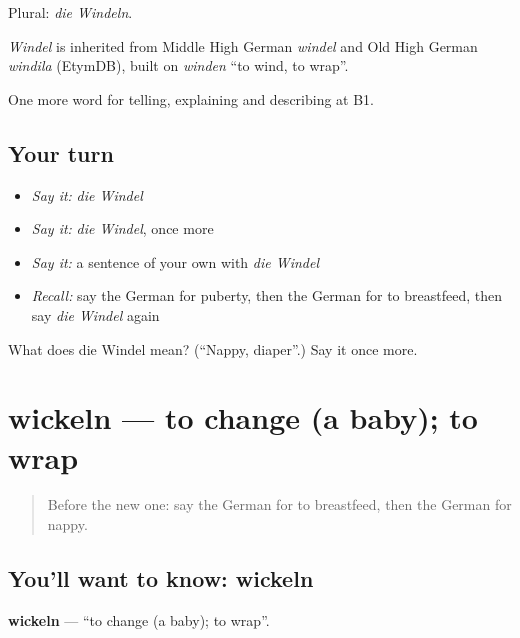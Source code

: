 Plural: \emph{die Windeln}.

\begin{cousinweb}
\emph{Windel} is inherited from Middle High German \emph{windel} and Old High German \emph{windila} (EtymDB), built on \emph{winden} \textquotedblleft{}to wind, to wrap\textquotedblright{}.
\end{cousinweb}

\begin{grammarlens}[title={What you've built}]
One more word for telling, explaining and describing at B1.
\end{grammarlens}

\subsection*{Your turn}
\begin{itemize}
\raggedright
  \item \emph{Say it:} \emph{die Windel}
  \item \emph{Say it:} \emph{die Windel}, once more
  \item \emph{Say it:} a sentence of your own with \emph{die Windel}
  \item \emph{Recall:} say the German for puberty, then the German for to breastfeed, then say \emph{die Windel} again
\end{itemize}

\begin{tcolorbox}[breakable,colback=teal!4,colframe=teal!35!black,title={Before you move on}]
What does die Windel mean? (\textquotedblleft{}Nappy, diaper\textquotedblright{}.) Say it once more.
\end{tcolorbox}
\section[wickeln]{wickeln — to change (a baby); to wrap}

\label{lesson:GE-C496-wickeln}



\begin{quote}
Before the new one: say the German for to breastfeed, then the German for nappy.
\end{quote}

\subsection*{You'll want to know: wickeln}
\textbf{wickeln} — \textquotedblleft{}to change (a baby); to wrap\textquotedblright{}.


